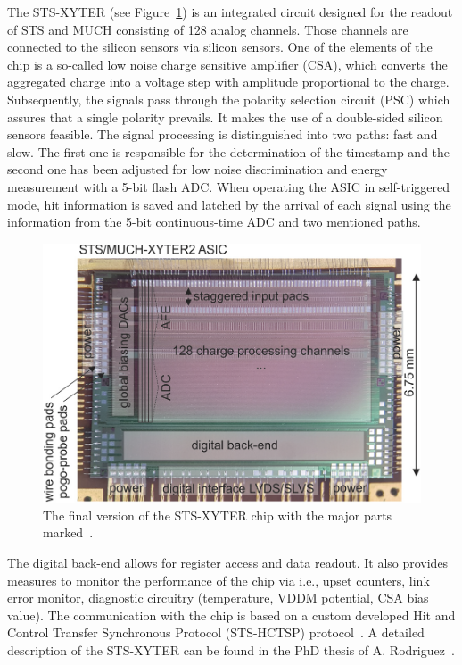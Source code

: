 The STS-XYTER (see Figure~\ref{sts_xyter}) is an integrated circuit designed for the readout of \gls{STS} and \gls{MUCH} consisting of 128 analog channels. Those channels are connected to the silicon sensors via silicon sensors. One of the elements of the chip is a so-called low noise charge sensitive amplifier (\gls{CSA}), which converts the aggregated charge into a voltage step with amplitude proportional to the charge. Subsequently, the signals pass through the polarity selection circuit (\gls{PSC}) which assures that a single polarity prevails. It makes the use of a double-sided silicon sensors feasible. The signal processing is distinguished into two paths: fast and slow. The first one is responsible for the determination of the timestamp and the second one has been adjusted for low noise discrimination and energy measurement with a 5-bit flash ADC. When operating the \gls{ASIC} in self-triggered mode, hit information is saved and latched by the arrival of each signal using the information from the 5-bit continuous-time ADC and two mentioned paths. 

\begin{figure}[!h]
\centering
\includegraphics[width=0.65\columnwidth]{Chapter2/images/ASIC2.2.png}
\caption{The final version of the STS-XYTER chip with the major parts marked~\cite{KASINSKI2018225}.}
\label{sts_xyter}
\end{figure}

The digital back-end allows for register access and data readout. It also provides measures to monitor the performance of the chip via i.e., upset counters, link error monitor, diagnostic circuitry (temperature, VDDM potential, CSA bias value). The communication with the chip is based on a custom developed Hit and Control Transfer Synchronous Protocol (STS-HCTSP) protocol~\cite{Kasinski_2016}. A detailed description of the STS-XYTER can be found in the PhD thesis of A. Rodriguez~\cite{RodriguezRodriguez2020}.

